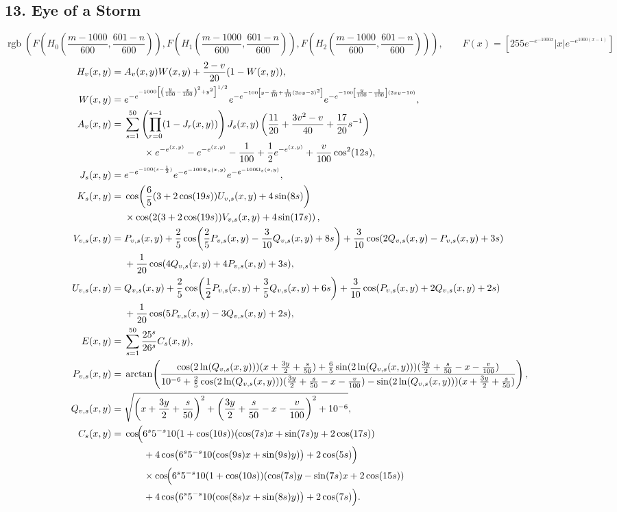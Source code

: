 \documentclass[10pt]{article}
\newcommand{\Fn}{F(x)=\left[255e^{-e^{-1000x}}|x|e^{-e^{1000(x-1)}}\right]}
\begin{document}
\begin{landscape}
\section*{13. Eye of a Storm}
\[
\operatorname{rgb}\!\left(
F\!\left(H_0\!\left(\frac{m-1000}{600},\frac{601-n}{600}\right)\right),
F\!\left(H_1\!\left(\frac{m-1000}{600},\frac{601-n}{600}\right)\right),
F\!\left(H_2\!\left(\frac{m-1000}{600},\frac{601-n}{600}\right)\right)
\right),\qquad \Fn
\]
\begin{align*}
H_v(x,y)={}&A_v(x,y)W(x,y)+\frac{2-v}{20}(1-W(x,y)),
\\
W(x,y)={}&
e^{-e^{-1000\left[
\left(\frac y{100}-\frac x{100}\right)^2+y^2\right]^{1/2}}}
e^{-e^{-100\left[
y-\frac{x}{10}+\frac1{10}\left(2xy-3\right)^2
\right]}}
e^{-e^{-100\left[
\frac y{100}-\frac1{100}\right]\left(2xy-10\right)}},
\\
A_v(x,y)={}&
\sum_{s=1}^{50}
\left(\prod_{r=0}^{s-1}(1-J_r(x,y))\right)
J_s(x,y)
\left(
\frac{11}{20}+\frac{3v^2-v}{40}+\frac{17}{20}s^{-1}
\right)
\\
&\qquad\times
e^{-e^{(x,y)}}
-e^{-e^{(x,y)}}
-\frac1{100}
+\frac12e^{-e^{(x,y)}}+\frac v{100}\cos^2(12s),
\\
J_s(x,y)={}&
e^{-e^{-100(s-\frac12)}}
e^{-e^{-100\Psi_s(x,y)}}
e^{-e^{-100\Omega_s(x,y)}},
\\
K_s(x,y)={}&
\cos\!\left(\frac65(3+2\cos(19s))U_{v,s}(x,y)+4\sin(8s)\right)
\\
&\times
\cos\!\left(2(3+2\cos(19s))V_{v,s}(x,y)+4\sin(17s)\right),
\\
V_{v,s}(x,y)={}&
P_{v,s}(x,y)
+\frac25\cos\!\left(\frac25P_{v,s}(x,y)-\frac3{10}Q_{v,s}(x,y)+8s\right)
+\frac3{10}\cos(2Q_{v,s}(x,y)-P_{v,s}(x,y)+3s)
\\
&+\frac1{20}\cos(4Q_{v,s}(x,y)+4P_{v,s}(x,y)+3s),
\\
U_{v,s}(x,y)={}&
Q_{v,s}(x,y)
+\frac25\cos\!\left(\frac12P_{v,s}(x,y)+\frac35Q_{v,s}(x,y)+6s\right)
+\frac3{10}\cos(P_{v,s}(x,y)+2Q_{v,s}(x,y)+2s)
\\
&+\frac1{20}\cos(5P_{v,s}(x,y)-3Q_{v,s}(x,y)+2s),
\\
E(x,y)={}&\sum_{s=1}^{50}\frac{25^s}{26^s}C_s(x,y),
\\
P_{v,s}(x,y)={}&
\arctan\!\left(
\frac{
\cos(2\ln(Q_{v,s}(x,y)))(x+\frac{3y}{2}+\frac{s}{50})
+\frac65\sin(2\ln(Q_{v,s}(x,y)))(\frac{3y}{2}+\frac{s}{50}-x-\frac v{100})
}{
10^{-6}+\frac25\cos(2\ln(Q_{v,s}(x,y)))(\frac{3y}{2}+\frac{s}{50}-x-\frac v{100})
-\sin(2\ln(Q_{v,s}(x,y)))(x+\frac{3y}{2}+\frac{s}{50})
}
\right),
\\
Q_{v,s}(x,y)={}&
\sqrt{\left(x+\frac{3y}{2}+\frac{s}{50}\right)^2
+\left(\frac{3y}{2}+\frac{s}{50}-x-\frac v{100}\right)^2+10^{-6}},
\\
C_s(x,y)={}&
\cos\!\Bigl(
6^s5^{-s}10(1+\cos(10s))
(\cos(7s)x+\sin(7s)y+2\cos(17s))
\\
&\qquad+4\cos\!\left(6^s5^{-s}10(\cos(9s)x+\sin(9s)y)\right)+2\cos(5s)
\Bigr)
\\
&\qquad\times
\cos\!\Bigl(
6^s5^{-s}10(1+\cos(10s))
(\cos(7s)y-\sin(7s)x+2\cos(15s))
\\
&\qquad+4\cos\!\left(6^s5^{-s}10(\cos(8s)x+\sin(8s)y)\right)+2\cos(7s)
\Bigr).
\end{align*}

\end{landscape}
\end{document}
